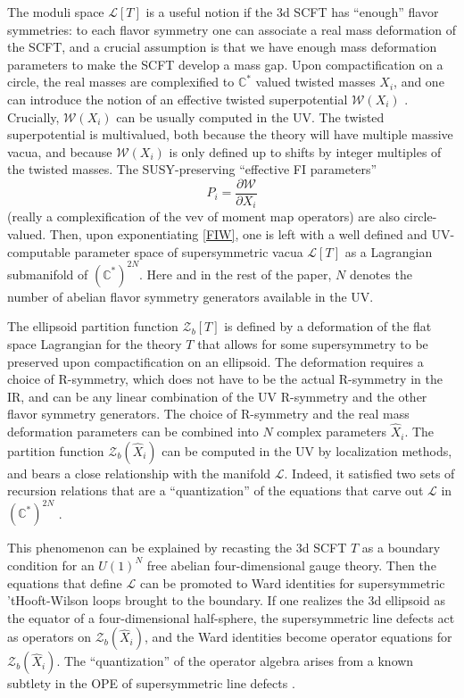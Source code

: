 \documentclass[11pt,letterpaper]{article}
\numberwithin{equation}{section}
\newcommand{\C}{{\mathbb C}}
\newcommand{\CL}{\mathcal{L}}
\newcommand{\CW}{\mathcal{W}}
\newcommand{\CZ}{\mathcal{Z}}
\begin{document}
The moduli space $\CL[T]$ is a useful notion if the 3d SCFT has ``enough'' flavor symmetries: to each flavor symmetry one can associate a real mass
deformation of the SCFT, and a crucial assumption is that we have enough mass deformation parameters to make the SCFT develop a mass gap.
Upon compactification on a circle, the real masses are complexified to $\C^*$ valued twisted masses $X_i$, and one can introduce the notion of an effective twisted superpotential
$\CW(X_i)$ \cite{Witten-phases}. Crucially, $\CW(X_i)$ can be usually computed in the UV.
The twisted superpotential is multivalued, both because the theory will have multiple massive vacua, and because $\CW(X_i)$ is only defined up to shifts by integer multiples of the
twisted masses. The SUSY-preserving ``effective FI parameters''
%
\begin{equation} \label{FIW}
P_i = \frac{\partial \CW}{\partial X_i}
\end{equation}
%
(really a complexification of the vev of moment map operators)
are also circle-valued. Then, upon exponentiating \eqref{FIW}, one is left with a well defined and UV-computable parameter space of supersymmetric vacua $\CL[T]$
as a Lagrangian submanifold of $(\C^*)^{2N}$. Here and in the rest of the paper, $N$ denotes the number of abelian flavor symmetry generators
available in the UV.

The ellipsoid partition function $\CZ_b[T]$ is defined by a deformation of the flat space Lagrangian for the theory $T$
that allows for some supersymmetry to be preserved upon compactification on an ellipsoid. The deformation requires a choice of R-symmetry,
which does not have to be the actual R-symmetry in the IR, and can be any linear combination of the UV R-symmetry and the other flavor symmetry generators.
The choice of R-symmetry and the real mass deformation parameters can be combined into $N$ complex parameters $\hat X_i$.
The partition function $\CZ_b(\hat X_i)$ can be computed in the UV by localization methods, and bears a close relationship with the manifold $\CL$.
Indeed, it satisfied two sets of recursion relations that are a ``quantization'' of the equations that carve out $\CL$ in $(\C^*)^{2N}$ \cite{DG-Sdual, DGG}.

This phenomenon can be explained by recasting the 3d SCFT $T$ as a boundary condition for an $U(1)^N$ free abelian four-dimensional gauge theory.
Then the equations that define $\CL$ can be promoted to Ward identities for supersymmetric 'tHooft-Wilson loops brought to the boundary.
If one realizes the 3d ellipsoid as the equator of a four-dimensional half-sphere, the supersymmetric line defects act as operators on $\CZ_b(\hat X_i)$,
and the Ward identities become operator equations for $\CZ_b(\hat X_i)$. The ``quantization'' of the operator algebra arises from a known subtlety in the
OPE of supersymmetric line defects \cite{GMNIII, Ramified}.
\end{document}

